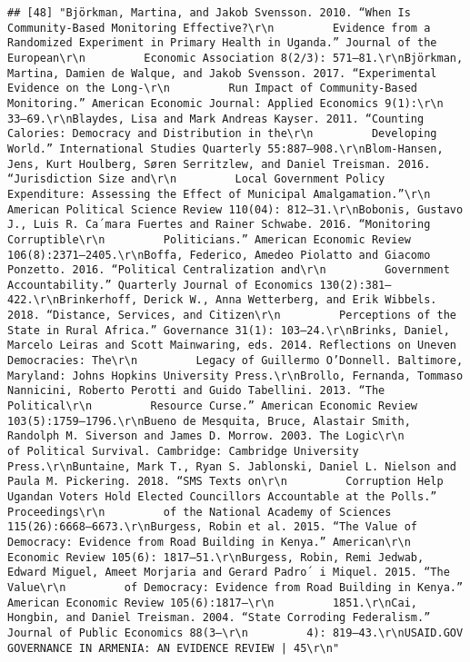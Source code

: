 \documentclass[
]{article}
\begin{document}
\begin{verbatim}
## [48] "Björkman, Martina, and Jakob Svensson. 2010. “When Is Community-Based Monitoring Effective?\r\n         Evidence from a Randomized Experiment in Primary Health in Uganda.” Journal of the European\r\n         Economic Association 8(2/3): 571–81.\r\nBjörkman, Martina, Damien de Walque, and Jakob Svensson. 2017. “Experimental Evidence on the Long-\r\n         Run Impact of Community-Based Monitoring.” American Economic Journal: Applied Economics 9(1):\r\n         33–69.\r\nBlaydes, Lisa and Mark Andreas Kayser. 2011. “Counting Calories: Democracy and Distribution in the\r\n         Developing World.” International Studies Quarterly 55:887–908.\r\nBlom-Hansen, Jens, Kurt Houlberg, Søren Serritzlew, and Daniel Treisman. 2016. “Jurisdiction Size and\r\n         Local Government Policy Expenditure: Assessing the Effect of Municipal Amalgamation.”\r\n         American Political Science Review 110(04): 812–31.\r\nBobonis, Gustavo J., Luis R. Ca´mara Fuertes and Rainer Schwabe. 2016. “Monitoring Corruptible\r\n         Politicians.” American Economic Review 106(8):2371–2405.\r\nBoffa, Federico, Amedeo Piolatto and Giacomo Ponzetto. 2016. “Political Centralization and\r\n         Government Accountability.” Quarterly Journal of Economics 130(2):381–422.\r\nBrinkerhoff, Derick W., Anna Wetterberg, and Erik Wibbels. 2018. “Distance, Services, and Citizen\r\n         Perceptions of the State in Rural Africa.” Governance 31(1): 103–24.\r\nBrinks, Daniel, Marcelo Leiras and Scott Mainwaring, eds. 2014. Reflections on Uneven Democracies: The\r\n         Legacy of Guillermo O’Donnell. Baltimore, Maryland: Johns Hopkins University Press.\r\nBrollo, Fernanda, Tommaso Nannicini, Roberto Perotti and Guido Tabellini. 2013. “The Political\r\n         Resource Curse.” American Economic Review 103(5):1759–1796.\r\nBueno de Mesquita, Bruce, Alastair Smith, Randolph M. Siverson and James D. Morrow. 2003. The Logic\r\n         of Political Survival. Cambridge: Cambridge University Press.\r\nBuntaine, Mark T., Ryan S. Jablonski, Daniel L. Nielson and Paula M. Pickering. 2018. “SMS Texts on\r\n         Corruption Help Ugandan Voters Hold Elected Councillors Accountable at the Polls.” Proceedings\r\n         of the National Academy of Sciences 115(26):6668–6673.\r\nBurgess, Robin et al. 2015. “The Value of Democracy: Evidence from Road Building in Kenya.” American\r\n         Economic Review 105(6): 1817–51.\r\nBurgess, Robin, Remi Jedwab, Edward Miguel, Ameet Morjaria and Gerard Padro´ i Miquel. 2015. “The Value\r\n         of Democracy: Evidence from Road Building in Kenya.” American Economic Review 105(6):1817–\r\n         1851.\r\nCai, Hongbin, and Daniel Treisman. 2004. “State Corroding Federalism.” Journal of Public Economics 88(3–\r\n         4): 819–43.\r\nUSAID.GOV                                                    GOVERNANCE IN ARMENIA: AN EVIDENCE REVIEW | 45\r\n"                                                                                                                                                                                                                                                                                                                                                                                                                               
\end{verbatim}
\end{document}
